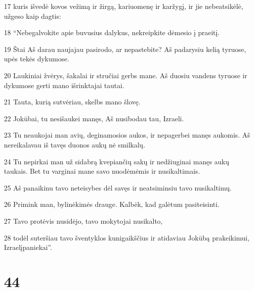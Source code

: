 \par 17 kuris išvedė kovos vežimą ir žirgą, kariuomenę ir karžygį, ir jie nebeatsikėlė, užgeso kaip dagtis: 
\par 18 “Nebegalvokite apie buvusius dalykus, nekreipkite dėmesio į praeitį. 
\par 19 Štai Aš darau nauja­jau pasirodo, ar nepastebite? Aš padarysiu kelią tyruose, upės tekės dykumose. 
\par 20 Laukiniai žvėrys, šakalai ir stručiai gerbs mane. Aš duosiu vandens tyruose ir dykumose gerti mano išrinktajai tautai. 
\par 21 Tauta, kurią sutvėriau, skelbs mano šlovę. 
\par 22 Jokūbai, tu nesišaukei manęs, Aš nusibodau tau, Izraeli. 
\par 23 Tu neaukojai man avių, deginamosios aukos, ir nepagerbei manęs aukomis. Aš nereikalavau iš tavęs duonos aukų nė smilkalų. 
\par 24 Tu nepirkai man už sidabrą kvepiančių sakų ir nedžiuginai manęs aukų taukais. Bet tu varginai mane savo nuodėmėmis ir nusikaltimais. 
\par 25 Aš panaikinu tavo neteisybes dėl savęs ir neatsiminsiu tavo nusikaltimų. 
\par 26 Primink man, bylinėkimės drauge. Kalbėk, kad galėtum pasiteisinti. 
\par 27 Tavo protėvis nusidėjo, tavo mokytojai nusikalto, 
\par 28 todėl suteršiau tavo šventyklos kunigaikščius ir atidaviau Jokūbą prakeikimui, Izraelį­paniekai”.



\chapter{44}


